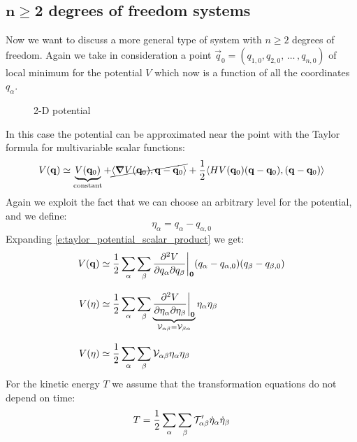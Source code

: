 \subsection{$\mathbf{n\geq 2}$ degrees of freedom systems}
Now we want to discuss a more general type of system with $n\geq2$ degrees of freedom. Again we take in consideration a point $\vec{q}_0 = (q_{1,0}, q_{2,0}, \,\dots\, ,q_{n,0})$ of local minimum for the potential $V$ which now is a function of all the coordinates $q_{\alpha}$.
\begin{figure}[!ht]
    \centering
    
    \caption{2-D potential}
    \label{fig:image11}
\end{figure}
In this case the potential can be approximated near the point with the Taylor formula for multivariable scalar functions:
\begin{equation} \label{e:taylor_potential_scalar_product}
    V(\vb{q}) \simeq \underbrace{V(\vb{q}_0)}_{\text{constant}} + \cancel{\langle \grad V(\vb{q}_0), \vb{q}-\vb{q}_0\rangle} + \dfrac{1}{2}\langle H V(\vb{q}_0)(\vb{q}-\vb{q}_0), (\vb{q}-\vb{q}_0)\rangle
\end{equation}
Again we exploit the fact that we can choose an arbitrary level for the potential, and we define:
\begin{equation}
    \eta_{\alpha} = q_{\alpha} - q_{\alpha,0}
\end{equation}
Expanding \eqref{e:taylor_potential_scalar_product} we get:
\begin{equation}
    \begin{split}
        V(\vb{q}) &\simeq \dfrac{1}{2}\displaystyle\sum_{\alpha}\displaystyle\sum_{\beta}\dfrac{\partial^2 V}{\partial q_{\alpha} \partial q_{\beta}}\bigg|_{\vb{0}}(q_{\alpha} - q_{\alpha,0})(q_{\beta} - q_{\beta,0})\\[8pt]
        V(\vb{\eta}) &\simeq \dfrac{1}{2}\displaystyle\sum_{\alpha}\displaystyle\sum_{\beta}\underbrace{\dfrac{\partial^2 V}{\partial \eta_{\alpha} \partial \eta_{\beta}}\bigg|_{\vb{0}}}_{\mathcal{V}_{\alpha \beta} = \mathcal{V}_{\beta \alpha}}\eta_{\alpha}\eta_{\beta}\\[8pt]
        V(\vb{\eta}) &\simeq \dfrac{1}{2}\displaystyle\sum_{\alpha}\displaystyle\sum_{\beta}\mathcal{V}_{\alpha \beta}\eta_{\alpha}\eta_{\beta}
    \end{split}
\end{equation}
For the kinetic energy $T$ we assume that the transformation equations do not depend on time:
\begin{equation}
    T = \dfrac{1}{2}\displaystyle\sum_{\alpha}\displaystyle\sum_{\beta}\mathcal{T}'_{\alpha \beta} \dot{\eta}_{\alpha}\dot{\eta}_{\beta}
\end{equation}
